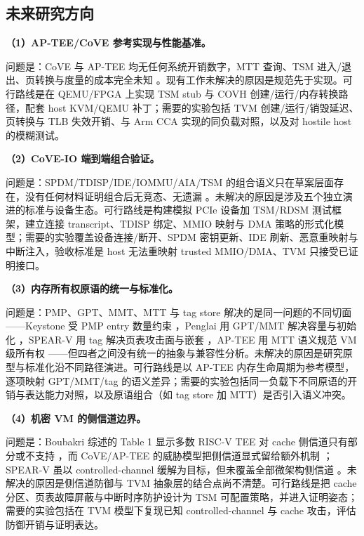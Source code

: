 \documentclass[11pt]{ctexart}
\begin{document}
\subsection{未来研究方向}
\noindent\textbf{（1）AP-TEE/CoVE 参考实现与性能基准。}\par
问题是：CoVE 与 AP-TEE 均无任何系统开销数字，MTT 查询、TSM 进入/退出、页转换与度量的成本完全未知 \cite{sahita2023cove,riscv_ap_tee_2024}。现有工作未解决的原因是规范先于实现。可行路线是在 QEMU/FPGA 上实现 TSM stub 与 COVH 创建/运行/内存转换路径，配套 host KVM/QEMU 补丁；需要的实验包括 TVM 创建/运行/销毁延迟、页转换与 TLB 失效开销、与 Arm CCA 实现的同负载对照，以及对 hostile host 的模糊测试。\par
\noindent\textbf{（2）CoVE-IO 端到端组合验证。}\par
问题是：SPDM/TDISP/IDE/IOMMU/AIA/TSM 的组合语义只在草案层面存在，没有任何材料证明组合后无竞态、无遗漏 \cite{riscv_cove_io_2026}。未解决的原因是涉及五个独立演进的标准与设备生态。可行路线是构建模拟 PCIe 设备加 TSM/RDSM 测试框架，建立连接 transcript、TDISP 绑定、MMIO 映射与 DMA 策略的形式化模型；需要的实验覆盖设备连接/断开、SPDM 密钥更新、IDE 刷新、恶意重映射与中断注入，验收标准是 host 无法重映射 trusted MMIO/DMA、TVM 只接受已证明接口。\par
\noindent\textbf{（3）内存所有权原语的统一与标准化。}\par
问题是：PMP、GPT、MMT、MTT 与 tag store 解决的是同一问题的不同切面——Keystone 受 PMP entry 数量约束 \cite{lee2020keystone}，Penglai 用 GPT/MMT 解决容量与初始化 \cite{feng2021penglai}，SPEAR-V 用 tag 解决页表攻击面与嵌套 \cite{schrammel2023spearv}，AP-TEE 用 MTT 语义规范 VM 级所有权 \cite{riscv_ap_tee_2024}——但四者之间没有统一的抽象与兼容性分析。未解决的原因是研究原型与标准化沿不同路径演进。可行路线是以 AP-TEE 内存生命周期为参考模型，逐项映射 GPT/MMT/tag 的语义差异；需要的实验包括同一负载下不同原语的开销与表达能力对照，以及原语组合（如 tag store 加 MTT）是否引入语义冲突。\par
\noindent\textbf{（4）机密 VM 的侧信道边界。}\par
问题是：Boubakri 综述的 Table 1 显示多数 RISC-V TEE 对 cache 侧信道只有部分或不支持 \cite{boubakri2025riscvtee}，而 CoVE/AP-TEE 的威胁模型把侧信道显式留给额外机制 \cite{sahita2023cove,riscv_ap_tee_2024}；SPEAR-V 虽以 controlled-channel 缓解为目标，但未覆盖全部微架构侧信道 \cite{schrammel2023spearv}。未解决的原因是侧信道防御与 TVM 抽象层的结合点尚不清楚。可行路线是把 cache 分区、页表故障屏蔽与中断时序防护设计为 TSM 可配置策略，并进入证明姿态；需要的实验包括在 TVM 模型下复现已知 controlled-channel 与 cache 攻击，评估防御开销与证明表达。\par
\end{document}
